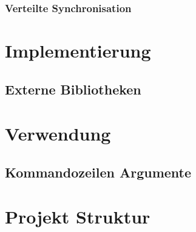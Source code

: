 \documentclass[12pt, letterpaper]{article}
\begin{document}
\subsubsection{Verteilte Synchronisation}

\section{Implementierung}

\subsection{Externe Bibliotheken}

\section{Verwendung}

\subsection{Kommandozeilen Argumente}

\section{Projekt Struktur}


\newpage


\end{document}
